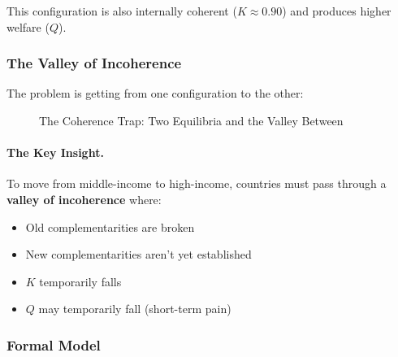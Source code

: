 This configuration is also internally coherent ($K \approx 0.90$) and produces 
higher welfare ($Q$).

\subsubsection{The Valley of Incoherence}

The problem is getting from one configuration to the other:

\begin{figure}[htbp]
\centering
\caption{The Coherence Trap: Two Equilibria and the Valley Between}
\label{fig:coherence-trap}
\begin{center}
\end{center}
\end{figure}

\paragraph{The Key Insight.}
To move from middle-income to high-income, countries must pass through a 
\textbf{valley of incoherence} where:
\begin{itemize}
    \item Old complementarities are broken
    \item New complementarities aren't yet established
    \item $K$ temporarily falls
    \item $Q$ may temporarily fall (short-term pain)
\end{itemize}

\subsubsection{Formal Model}

